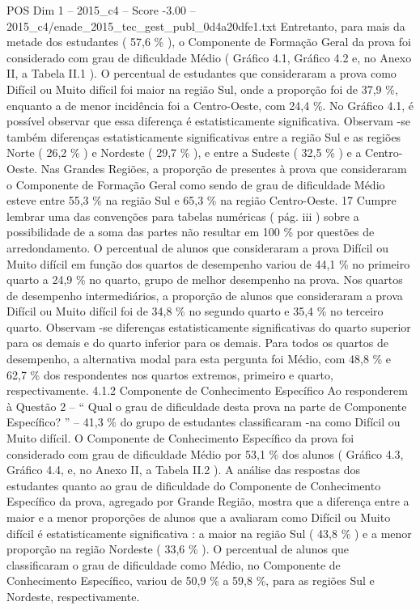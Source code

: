 \begin{textsample}{POS Dim 1 – 2015\_c4 – Score -3.00 – 2015\_c4/enade\_2015\_tec\_gest\_publ\_0d4a20dfe1.txt}
Entretanto, para mais da metade dos estudantes ( 57,6 \% ), o Componente de Formação Geral da prova foi considerado com grau de dificuldade Médio ( Gráfico 4.1, Gráfico 4.2 e, no Anexo II, a Tabela II.1 ).
O percentual de estudantes que consideraram a prova como Difícil ou Muito difícil foi maior na região Sul, onde a proporção foi de 37,9 \%, enquanto a de menor incidência foi a Centro-Oeste, com 24,4 \%.
No Gráfico 4.1, é possível observar que essa diferença é estatisticamente significativa.
Observam -se também diferenças estatisticamente significativas entre a região Sul e as regiões Norte ( 26,2 \% ) e Nordeste ( 29,7 \% ), e entre a Sudeste ( 32,5 \% ) e a Centro-Oeste.
Nas Grandes Regiões, a proporção de presentes à prova que consideraram o Componente de Formação Geral como sendo de grau de dificuldade Médio esteve entre 55,3 \% na região Sul e 65,3 \% na região Centro-Oeste. 17 Cumpre lembrar uma das convenções para tabelas numéricas ( pág. iii ) sobre a possibilidade de a soma das partes não resultar em 100 \% por questões de arredondamento.
O percentual de alunos que consideraram a prova Difícil ou Muito difícil em função dos quartos de desempenho variou de 44,1 \% no primeiro quarto a 24,9 \% no quarto, grupo de melhor desempenho na prova.
Nos quartos de desempenho intermediários, a proporção de alunos que consideraram a prova Difícil ou Muito difícil foi de 34,8 \% no segundo quarto e 35,4 \% no terceiro quarto.
Observam -se diferenças estatisticamente significativas do quarto superior para os demais e do quarto inferior para os demais.
Para todos os quartos de desempenho, a alternativa modal para esta pergunta foi Médio, com 48,8 \% e 62,7 \% dos respondentes nos quartos extremos, primeiro e quarto, respectivamente. 4.1.2 Componente de Conhecimento Específico Ao responderem à Questão 2 – “ Qual o grau de dificuldade desta prova na parte de Componente Específico? ” – 41,3 \% do grupo de estudantes classificaram -na como Difícil ou Muito difícil.
O Componente de Conhecimento Específico da prova foi considerado com grau de dificuldade Médio por 53,1 \% dos alunos ( Gráfico 4.3, Gráfico 4.4, e, no Anexo II, a Tabela II.2 ).
A análise das respostas dos estudantes quanto ao grau de dificuldade do Componente de Conhecimento Específico da prova, agregado por Grande Região, mostra que a diferença entre a maior e a menor proporções de alunos que a avaliaram como Difícil ou Muito difícil é estatisticamente significativa : a maior na região Sul ( 43,8 \% ) e a menor proporção na região Nordeste ( 33,6 \% ).
O percentual de alunos que classificaram o grau de dificuldade como Médio, no Componente de Conhecimento Específico, variou de 50,9 \% a 59,8 \%, para as regiões Sul e Nordeste, respectivamente.

\end{textsample}
